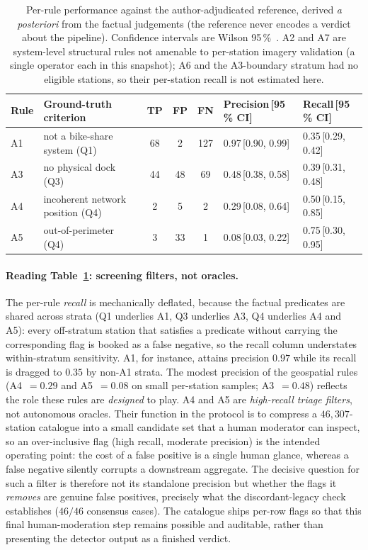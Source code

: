 \documentclass[11pt,a4paper]{article}
\begin{document}
\begin{table}[!htbp]
\centering
\caption{Per-rule performance against the author-adjudicated reference,
derived \emph{a posteriori} from the factual judgements (the reference never
encodes a verdict about the pipeline). Confidence intervals are Wilson
95\,\%~\cite{Wilson1927Interval}. A2 and A7 are system-level structural
rules not amenable to per-station imagery validation (a single operator
each in this snapshot); A6 and the A3-boundary stratum had no eligible
stations, so their per-station recall is not estimated here.}
\label{tab:perrule}
\small
\begin{tabular}{@{}llcccll@{}}
\toprule
\textbf{Rule} & \textbf{Ground-truth criterion} & \textbf{TP} & \textbf{FP}
              & \textbf{FN} & \textbf{Precision\,[95\,\% CI]} & \textbf{Recall\,[95\,\% CI]}\\
\midrule
A1 & not a bike-share system (Q1)     & 68 &  2 & 127 & 0.97\,[0.90, 0.99] & 0.35\,[0.29, 0.42]\\
A3 & no physical dock (Q3)            & 44 & 48 &  69 & 0.48\,[0.38, 0.58] & 0.39\,[0.31, 0.48]\\
A4 & incoherent network position (Q4) &  2 &  5 &   2 & 0.29\,[0.08, 0.64] & 0.50\,[0.15, 0.85]\\
A5 & out-of-perimeter (Q4)            &  3 & 33 &   1 & 0.08\,[0.03, 0.22] & 0.75\,[0.30, 0.95]\\
\bottomrule
\end{tabular}
\end{table}

\paragraph{Reading Table~\ref{tab:perrule}: screening filters, not oracles.}
The per-rule \emph{recall} is mechanically deflated, because the
factual predicates are shared across strata
(Q1 underlies A1, Q3 underlies A3, Q4 underlies A4 and A5): every off-stratum
station that satisfies a predicate without carrying the corresponding flag is
booked as a false negative, so the recall column understates within-stratum
sensitivity. A1, for instance, attains precision $0.97$ while its recall is
dragged to $0.35$ by non-A1 strata. The modest precision of the geospatial
rules (A4~$=0.29$ and A5~$=0.08$ on small per-station samples; A3~$=0.48$)
reflects the role these rules are \emph{designed} to play. A4 and A5 are
\emph{high-recall triage filters}, not autonomous oracles. Their function in
the protocol is to compress a $46{,}307$-station catalogue into a small
candidate set that a human moderator can inspect, so an over-inclusive flag
(high recall, moderate precision) is the intended operating point: the cost of
a false positive is a single human glance, whereas a false negative silently
corrupts a downstream aggregate. The decisive question for such a filter
is therefore not its standalone precision but whether the flags it
\emph{removes} are genuine false positives, precisely what the
discordant-legacy check establishes ($46/46$ consensus cases). The catalogue
ships per-row flags so that this final human-moderation step remains possible
and auditable, rather than presenting the detector output as a finished verdict.
\end{document}
